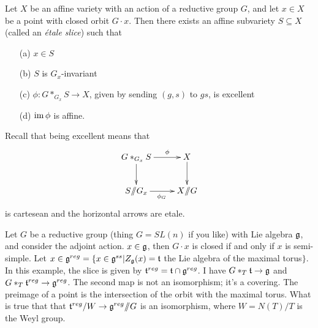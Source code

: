 
\begin{theorem}
 Let $X$ be an affine variety with an action of a reductive group $G$, and let $x\in X$ be a point with closed orbit $G\cdot x$. Then there exists an affine subvariety $S\subseteq X$ (called an \emph{\'etale slice}) such that
 \begin{enumerate}
  \item[(a)] $x\in S$
  \item[(b)] $S$ is $G_x$-invariant
  \item[(c)] $\phi\colon G*_{G_x}S\to X$, given by sending $(g,s)$ to $gs$, is excellent
  \item[(d)] $\operatorname{im} \phi$ is affine.
 \end{enumerate}
\end{theorem}
Recall that being excellent means that
\[\xymatrix{
 G *_{G_x}S\ar[r]^-\phi \ar[d] & X \ar[d]\\
 S\quot G_x \ar[r]_{\phi_G} & X\quot G
}\]
is cartesean and the horizontal arrows are etale.

\begin{example}
 Let $G$ be a reductive group (thing $G=SL(n)$ if you like) with Lie algebra $\mathfrak{g}$, and consider the adjoint action. $x\in \mathfrak{g}$, then $G\cdot x$ is closed if and only if $x$ is semi-simple. Let $x\in \mathfrak{g}^{reg}=\{x\in \mathfrak{g}^{ss}|Z_{\mathfrak{g}}(x)=\mathfrak{t}$ the Lie algebra of the maximal torus$\}$. In this example, the slice is given by $\mathfrak{t}^{reg}=\mathfrak{t}\cap\mathfrak{g}^{reg}$. I have $G*_T \mathfrak{t}\to \mathfrak{g}$ and $G*_T\mathfrak{t}^{reg}\to \mathfrak{g}^{reg}$. The second map is not an isomorphism; it's a covering. The preimage of a point is the intersection of the orbit with the maximal torus. What is true that that $\mathfrak{t}^{reg}/W\to \mathfrak{g}^{reg}\mbox{\rm /\!\!/} G$ is an isomorphism, where $W=N(T)/T$ is the Weyl group.
\end{example}

